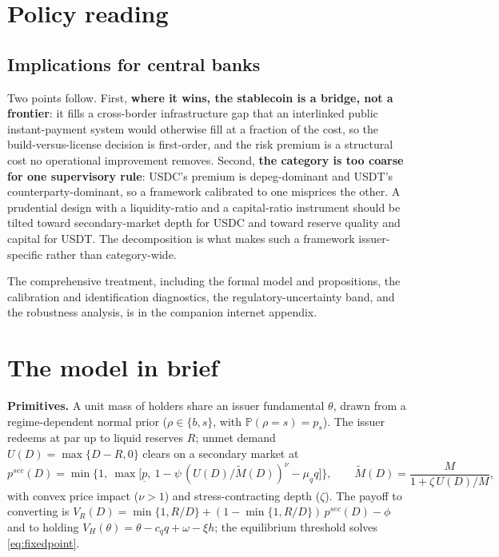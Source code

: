 \documentclass[12pt]{article}
\begin{document}
\section{Policy reading}\label{sec:discussion}

\subsection{Implications for central banks}\label{sub:policy_implications}

Two points follow. First, \textbf{where it wins, the stablecoin is a bridge, not a frontier}: it fills a cross-border infrastructure gap that an interlinked public instant-payment system would otherwise fill at a fraction of the cost, so the build-versus-license decision is first-order, and the risk premium is a structural cost no operational improvement removes. Second, \textbf{the category is too coarse for one supervisory rule}: USDC's premium is depeg-dominant and USDT's counterparty-dominant, so a framework calibrated to one misprices the other. A prudential design with a liquidity-ratio and a capital-ratio instrument \citep{goel_lewrick_agarwal_2026} should be tilted toward secondary-market depth for USDC and toward reserve quality and capital for USDT. The decomposition is what makes such a framework issuer-specific rather than category-wide.

The comprehensive treatment, including the formal model and propositions, the calibration and identification diagnostics, the regulatory-uncertainty band, and the robustness analysis, is in the companion internet appendix.

\clearpage



\clearpage
\appendix
\section{The model in brief}\label{app:dt_model}

\textbf{Primitives.} A unit mass of holders share an issuer fundamental $\theta$, drawn from a regime-dependent normal prior ($\rho\in\{b,s\}$, with $\mathbb{P}(\rho=s)=p_s$). The issuer redeems at par up to liquid reserves $R$; unmet demand $U(D)=\max\{D-R,0\}$ clears on a secondary market at
\[
p^{sec}(D)=\min\!\Big\{1,\ \max\big[\underline p,\ 1-\psi\,(U(D)/\widetilde M(D))^{\nu}-\mu_q q\big]\Big\},\qquad
\widetilde M(D)=\frac{M}{1+\zeta\,U(D)/M},
\]
with convex price impact ($\nu>1$) and stress-contracting depth ($\zeta$). The payoff to converting is $V_R(D)=\min\{1,R/D\}+(1-\min\{1,R/D\})\,p^{sec}(D)-\phi$ and to holding $V_H(\theta)=\theta-c_q q+\omega-\xi h$; the equilibrium threshold solves \eqref{eq:fixedpoint}.
\end{document}
